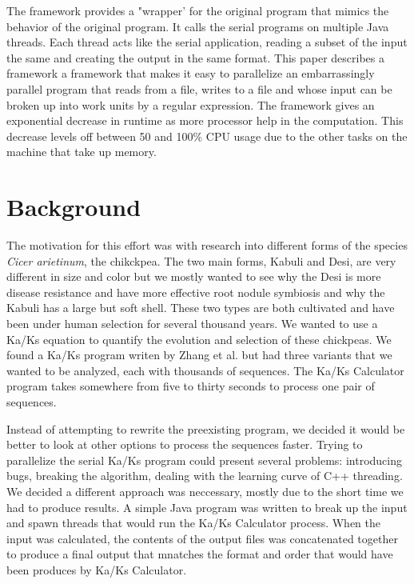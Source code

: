 \documentclass[12pt]{article}
\begin{document}
The framework provides a "wrapper' for the original program that mimics the
behavior of the original program. It calls the serial programs on multiple Java 
threads. Each thread acts like the serial application, reading a subset of the 
input the same and creating the output in the same format. This paper describes
a framework a framework that makes it easy to parallelize an embarrassingly
parallel program that reads from a file, writes to a file and whose input can be
broken up into work units by a regular expression. The framework gives an
exponential decrease in runtime as more processor help in the computation. This
decrease levels off between 50 and 100\% CPU usage due to the other tasks on the
machine that take up memory.

\section{Background}

The motivation for this effort was with research into different forms of the 
species \emph{Cicer arietinum}, the chikckpea. The two main forms, Kabuli and 
Desi, are very different in size and color but we mostly wanted to see why the 
Desi is more disease resistance and have more effective root nodule symbiosis 
and why the Kabuli has a large but soft shell. These two types are both 
cultivated and have been under human selection for several thousand years. We 
wanted to use a Ka/Ks equation to quantify the evolution and selection of these 
chickpeas. We found a Ka/Ks program writen by Zhang et al. \cite{kaks} but had 
three variants that we wanted to be analyzed, each with thousands of sequences. 
The Ka/Ks Calculator program takes somewhere from five to thirty seconds to 
process one pair of sequences. 

Instead of attempting to rewrite the preexisting program, we decided it would be
better to look at other options to process the sequences faster. Trying to 
parallelize the serial Ka/Ks program could present several problems: introducing
bugs, breaking the algorithm, dealing with the learning curve of C++ threading. 
We decided a  different approach was neccessary, mostly due to the short time we
had to produce results. A simple Java program was written to break up the input 
and spawn  threads that would run the Ka/Ks Calculator process. When the input 
was calculated, the contents of the output files was concatenated together to 
produce a final output that mnatches the format and order that would have been
produces by Ka/Ks Calculator.
\end{document}
